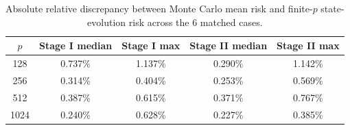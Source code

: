 \begin{table}[t]
\centering
\caption{Absolute relative discrepancy between Monte Carlo mean risk and finite-$p$ state-evolution risk across the 6 matched cases.}
\label{tab:se-risk-accuracy}
\small
\begin{tabular}{c@{\qquad}cccc}
\toprule
$p$ & Stage I median & Stage I max & Stage II median & Stage II max \\
\midrule
128 & 0.737\% & 1.137\% & 0.290\% & 1.142\% \\
256 & 0.314\% & 0.404\% & 0.253\% & 0.569\% \\
512 & 0.387\% & 0.615\% & 0.371\% & 0.767\% \\
1024 & 0.240\% & 0.628\% & 0.227\% & 0.385\% \\
\bottomrule
\end{tabular}
\end{table}
